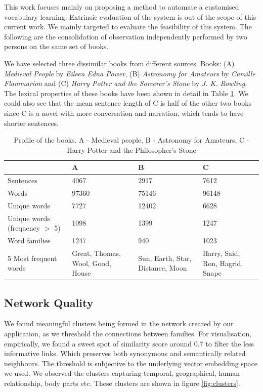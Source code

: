 \documentclass[11pt,a4paper]{article}
\begin{document}
This work focuses mainly on proposing a method to automate a customised vocabulary learning. Extrinsic evaluation of the system is out of the scope of this current work. We mainly targeted to evaluate the feasibility of this system. The following are the consolidation of observation independently performed by two persons on the same set of books.

We have selected three dissimilar books from different sources. Books: (A) \textit{Medieval People} by \textit{Eileen Edna Power},  (B) \textit{Astronomy for Amateurs} by \textit{Camille Flammarion}  and (C) \textit{Harry Potter and the Sorcerer's Stone} by \textit{J. K. Rowling}. The lexical properties of these books have been shown in detail in Table \ref{tab:book profile}. We could also see that the mean sentence length of C is half of the other two books since C is a novel with more conversation and narration, which tends to have shorter sentences.

\begin{table}{\textwidth}
\begin{tabular}[hbt!]{| p{5cm} | p{2cm} p{2cm} p{2cm} | }
\hline
   & A & B & C  \\
 \hline
 Sentences & 4067 & 2917 & 7612 \\ 
 Words & 97360 & 75146 & 96148 \\ 
Unique words & 7727  & 12402 & 6628 \\ 
 Unique words (frequency $>$ 5) & 1098 & 1399 & 1247 \\ 
 Word families & 1247 & 940 & 1023 \\ 
 5 Most frequent words & Great, Thomas, Wool, Good, House & Sun, Earth, Star, Distance, Moon & Harry, Said, Ron, Hagrid, Snape \\ 
 \hline
\end{tabular}
\caption{Profile of the books. A - Medieval people, B - Astronomy for Amateurs, C - Harry Potter and the Philosopher's Stone}
\label{tab:book profile}
\end{table}

\subsection{Network Quality}
We found meaningful clusters being formed in the network created by our application, as we threshold the connections between families. For visualisation, empirically, we found a sweet spot of similarity score around 0.7 to filter the less informative links. Which preserves both synonymous and semantically related neighbours. The threshold is subjective to the underlying vector embedding space we used. We observed the clusters capturing temporal, geographical, human relationship, body parts etc. These clusters are shown in figure \ref{fig:clusters}.
\end{document}
